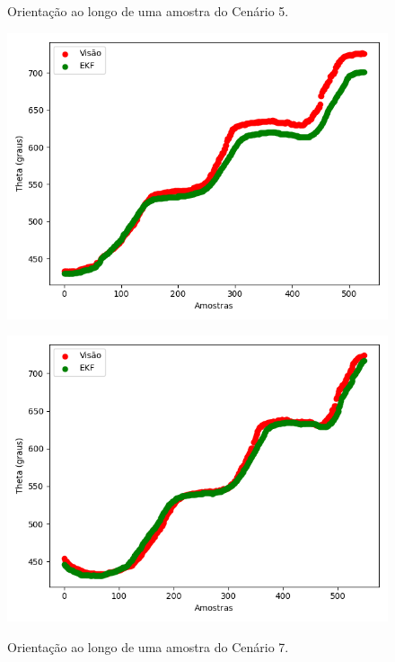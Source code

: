 \documentclass[acronym, symbols, table, deposito]{fei}
\begin{document}
		\begin{figure}
			\centering
			\begin{minipage}[t]{0.47\textwidth}
				\centering
				\caption{Orientação ao longo de uma amostra do Cenário 5.}
				\includegraphics[width=\textwidth]{orientacao_imu_encoder.png}
				\label{fig:orientacao_imu_encoder}
			\end{minipage}
			\hspace{1em}
			\begin{minipage}[t]{0.47\textwidth}
				\centering
				\caption{Orientação ao longo de uma amostra do Cenário 7.}
				\includegraphics[width=\textwidth]{orientacao_encoder_imu.png}
				\label{fig:orientacao_encoder_imu}
			\end{minipage}
		\end{figure}
	
\end{document}
